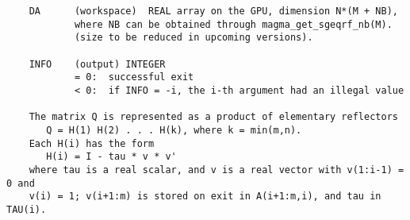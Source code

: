 \documentclass[10pt]{book}
\begin{document}
\begin{verbatim}
    DA      (workspace)  REAL array on the GPU, dimension N*(M + NB), 
            where NB can be obtained through magma_get_sgeqrf_nb(M).
            (size to be reduced in upcoming versions).

    INFO    (output) INTEGER   
            = 0:  successful exit   
            < 0:  if INFO = -i, the i-th argument had an illegal value   
   
    The matrix Q is represented as a product of elementary reflectors   
       Q = H(1) H(2) . . . H(k), where k = min(m,n).   
    Each H(i) has the form   
       H(i) = I - tau * v * v'   
    where tau is a real scalar, and v is a real vector with v(1:i-1) = 0 and
    v(i) = 1; v(i+1:m) is stored on exit in A(i+1:m,i), and tau in TAU(i).   
\end{verbatim}

\newpage
\end{document}
